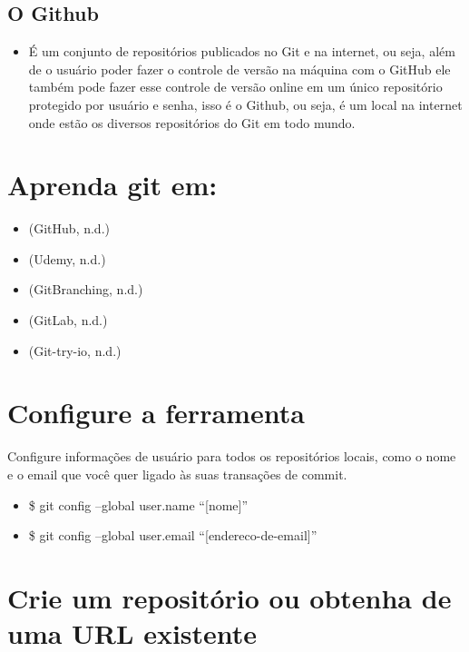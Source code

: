 \documentclass[]{tufte-handout}
\providecommand{\tightlist}{%
  \setlength{\itemsep}{0pt}\setlength{\parskip}{0pt}}
\begin{document}
\subsection{O Github}\label{o-github}

\begin{itemize}
\tightlist
\item
  É um conjunto de repositórios publicados no Git e na internet, ou
  seja, além de o usuário poder fazer o controle de versão na máquina
  com o GitHub ele também pode fazer esse controle de versão online em
  um único repositório protegido por usuário e senha, isso é o Github,
  ou seja, é um local na internet onde estão os diversos repositórios do
  Git em todo mundo.
\end{itemize}

\section{Aprenda git em:}\label{aprenda-git-em}

\begin{itemize}
\tightlist
\item
  (GitHub, n.d.)
\item
  (Udemy, n.d.)
\item
  (GitBranching, n.d.)
\item
  (GitLab, n.d.)
\item
  (Git-try-io, n.d.)
\end{itemize}

\section{Configure a ferramenta}\label{configure-a-ferramenta}

Configure informações de usuário para todos os repositórios locais, como
o nome e o email que você quer ligado às suas transações de commit.

\begin{itemize}
\item
  \$ git config --global user.name ``{[}nome{]}''
\item
  \$ git config --global user.email ``{[}endereco-de-email{]}''
\end{itemize}

\section{Crie um repositório ou obtenha de uma URL
existente}\label{crie-um-repositorio-ou-obtenha-de-uma-url-existente}
\end{document}
